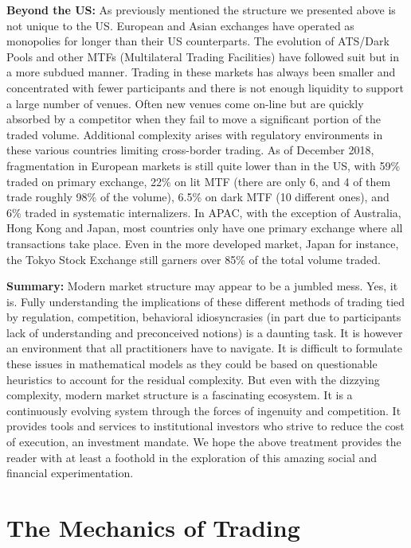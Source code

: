 \noindent\textbf{Beyond the US:} As previously mentioned the structure we presented above is not unique to the US. European and Asian exchanges have operated as monopolies for longer than their US counterparts. The evolution of ATS/Dark Pools and other MTFs (Multilateral Trading Facilities) have followed suit but in a more subdued manner. Trading in these markets has always been smaller and concentrated with fewer participants and there is not enough liquidity to support a large number of venues. Often new venues come on-line but are quickly absorbed by a competitor when they fail to move a significant portion of the traded volume. Additional complexity arises with regulatory environments in these various countries limiting cross-border trading. As of December 2018, fragmentation in European markets is still quite lower than in the US, with 59\% traded on primary exchange, 22\% on lit MTF (there are only 6, and 4 of them trade roughly 98\% of the volume), 6.5\% on dark MTF (10 different ones), and 6\% traded in systematic internalizers. In APAC, with the exception of Australia, Hong Kong and Japan, most countries only have one primary exchange where all transactions take place. Even in the more developed market, Japan for instance, the Tokyo Stock Exchange still garners over 85\% of the total volume traded. \twomedskip


\noindent\textbf{Summary:} Modern market structure may appear to be a jumbled mess. Yes, it is. Fully understanding the implications of these different methods of trading tied by regulation, competition, behavioral idiosyncrasies (in part due to participants lack of understanding and preconceived notions) is a daunting task. It is however an environment that all practitioners have to navigate. It is difficult to formulate these issues in mathematical models as they could be based on questionable heuristics to account for the residual complexity. But even with the dizzying complexity, modern market structure is a fascinating ecosystem. It is a continuously evolving system through the forces of ingenuity and competition. It provides tools and services to institutional investors who strive to reduce the cost of execution, an investment mandate. We hope the above treatment provides the reader with at least a foothold in the exploration of this amazing social and financial experimentation.


\section{The Mechanics of Trading}

